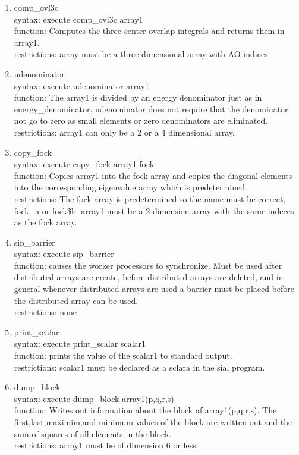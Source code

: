 \documentclass[12pt]{article}
\begin{document}
\begin{enumerate}
\item comp\_ovl3c\\ 
syntax: execute comp\_ovl3c array1\\ 
function: Computes the three center overlap integrals and returns them in array1.\\ 
restrictions: array must be a three-dimensional array with AO indices.

\item udenominator\\
syntax: execute udenominator array1\\ 
function: The array1 is divided by an energy denominator just as in energy\_denominator. 
udenominator does not require that the denominator not go to zero as small elements or 
zero denominators are eliminated.\\ 
restrictions: array1 can only be a 2 or a 4 dimensional array.

\item copy\_fock\\ 
syntax: execute copy\_fock array1 fock\\ 
function: Copies array1 into the fock array and copies the diagonal elements into the 
corresponding eigenvalue array which is predetermined.\\ 
restrictions: The fock array is predetermined so the name must be correct, fock\_a or fock\$b. 
array1 must be a 2-dimension array with the same indeces as the fock array.

\item sip\_barrier\\ 
syntax: execute sip\_barrier\\ 
function: causes the worker processors to synchronize. Must be used after distributed 
arrays are create, before distributed arrays are deleted, and in general whenever distributed 
arrays are used a barrier must be placed before the distributed array can be used.\\ 
restrictions: none

\item print\_scalar\\ 
syntax: execute print\_scalar scalar1\\ 
function: prints the value of the scalar1 to standard output.\\
restrictions: scalar1 must be declared as a sclara in the sial program.

\item dump\_block\\
syntax: execute dump\_block array1(p,q,r,s)\\ 
function: Writes out information about the block af array1(p,q,r,s). 
The first,last,maximim,and minimum values of the block are written out and the sum of 
squares of all elements in the block.\\
restrictions: array1 must be of dimension 6 or less.


\end{enumerate}
\end{document}
